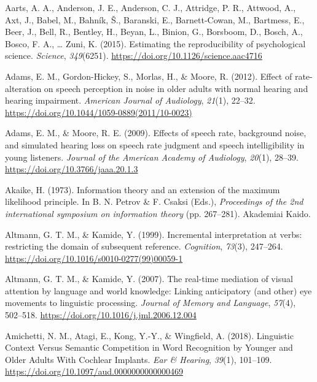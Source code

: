 \documentclass[a4paper, nobind]{templates/ociamthesis}
\newlength{\cslhangindent}
\newenvironment{CSLReferences}[2] %
 {%
  \setlength{\parindent}{0pt}
  \ifodd #1
  \let\oldpar\par
  \def\par{\hangindent=\cslhangindent\oldpar}
  \fi
  \setlength{\parskip}{1mm}
  \setlength{\baselineskip}{6mm}
 }%
 {}
\begin{document}
\hypertarget{refs}{}
\begin{CSLReferences}{1}{0}
\leavevmode{}%
Aarts, A. A., Anderson, J. E., Anderson, C. J., Attridge, P. R., Attwood, A., Axt, J., Babel, M., Bahník, Š., Baranski, E., Barnett-Cowan, M., Bartmess, E., Beer, J., Bell, R., Bentley, H., Beyan, L., Binion, G., Borsboom, D., Bosch, A., Bosco, F. A., \ldots{} Zuni, K. (2015). {Estimating the reproducibility of psychological science}. \emph{Science}, \emph{349}(6251). \url{https://doi.org/10.1126/science.aac4716}

\leavevmode{}%
Adams, E. M., Gordon-Hickey, S., Morlas, H., \& Moore, R. (2012). {Effect of rate-alteration on speech perception in noise in older adults with normal hearing and hearing impairment}. \emph{American Journal of Audiology}, \emph{21}(1), 22--32. \url{https://doi.org/10.1044/1059-0889(2011/10-0023)}

\leavevmode{}%
Adams, E. M., \& Moore, R. E. (2009). {Effects of speech rate, background noise, and simulated hearing loss on speech rate judgment and speech intelligibility in young listeners}. \emph{Journal of the American Academy of Audiology}, \emph{20}(1), 28--39. \url{https://doi.org/10.3766/jaaa.20.1.3}

\leavevmode{}%
Akaike, H. (1973). Information theory and an extension of the maximum likelihood principle. In B. N. Petrov \& F. Csaksi (Eds.), \emph{Proceedings of the 2nd international symposium on information theory} (pp. 267--281). Akademiai Kaido.

\leavevmode{}%
Altmann, G. T. M., \& Kamide, Y. (1999). Incremental interpretation at verbs: restricting the domain of subsequent reference. \emph{Cognition}, \emph{73}(3), 247--264. \url{https://doi.org/10.1016/s0010-0277(99)00059-1}

\leavevmode{}%
Altmann, G. T. M., \& Kamide, Y. (2007). {The real-time mediation of visual attention by language and world knowledge: Linking anticipatory (and other) eye movements to linguistic processing}. \emph{Journal of Memory and Language}, \emph{57}(4), 502--518. \url{https://doi.org/10.1016/j.jml.2006.12.004}

\leavevmode{}%
Amichetti, N. M., Atagi, E., Kong, Y.-Y., \& Wingfield, A. (2018). Linguistic Context Versus Semantic Competition in Word Recognition by Younger and Older Adults With Cochlear Implants. \emph{Ear \& Hearing}, \emph{39}(1), 101--109. \url{https://doi.org/10.1097/aud.0000000000000469}


\end{CSLReferences}
\end{document}
